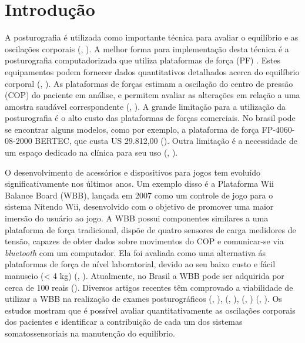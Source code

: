 \chapter{Introdução}
A posturografia é utilizada como importante técnica para avaliar o equilíbrio e as oscilações corporais (\citeauthor{prieto1996measures}, \citeyear{prieto1996measures}). A melhor forma para  implementação desta técnica é a posturografia computadorizada que utiliza plataformas de força (PF) . Estes  equipamentos podem fornecer dados quantitativos detalhados acerca do equilíbrio corporal (\citeauthor{hendrickson2014relationship}, \citeyear{hendrickson2014relationship}). As plataformas de forças  estimam a oscilação do centro de pressão (COP) do paciente em análise, e permitem avaliar as alterações em relação a uma amostra saudável correspondente (\citeauthor{llorens2016posturography}, \citeyear{llorens2016posturography}).  A grande limitação para a utilização da posturografia é o alto custo das plataformas de forças comerciais. No brasil pode se encontrar alguns modelos, como por exemplo, a plataforma de força FP-4060-08-2000 BERTEC, que custa US 29.812,00 (\citeauthor{CarciPF}). Outra limitação é a necessidade de um espaço dedicado na clínica para seu uso (\citeauthor{visser2008clinical}, \citeyear{visser2008clinical}).

O desenvolvimento de acessórios e dispositivos para jogos tem evoluído significativamente nos últimos anos. Um exemplo disso é a Plataforma Wii Balance Board (WBB), lançada em 2007 como um controle de jogo para o sistema Nitendo  Wii, desenvolvido com o objetivo de promover uma maior imersão do usuário ao jogo. A WBB possui componentes similares a uma plataforma de força tradicional, dispõe de quatro sensores de carga medidores de tensão, capazes de obter dados sobre movimentos do COP e comunicar-se via \textit{bluetooth} com um computador. Ela foi avaliada como uma alternativa ás plataformas de força de nível laboratorial, devido ao seu baixo custo e fácil manuseio (< 4 kg) (\citeauthor{clark2018reliability}, \citeyear{clark2018reliability}). Atualmente, no Brasil a WBB pode ser adquirida por cerca de 100 reais (\citeauthor{AmericanasWBB}). Diversos artigos recentes têm comprovado a viabilidade de utilizar a WBB na realização de exames posturográficos  (\citeauthor{clark2010validity}, \citeyear{clark2010validity}), (\citeauthor{young2011assessing},
\citeyear{young2011assessing}),  (\citeauthor{leach2014validating}, \citeyear{leach2014validating}) (\citeauthor{clark2018reliability}, \citeyear{clark2018reliability}). Os estudos mostram que é possível avaliar quantitativamente as oscilações corporais dos pacientes e identificar a contribuição de cada um dos sistemas somatossensoriais na manutenção do equilíbrio.

